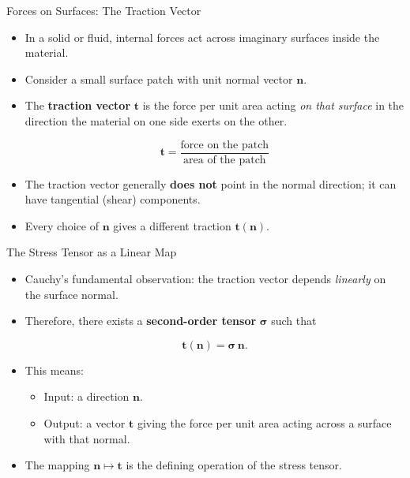 \documentclass{beamer}
\begin{document}
\begin{frame}{Forces on Surfaces: The Traction Vector}

\begin{itemize}

\item In a solid or fluid, internal forces act across imaginary surfaces inside the material.
\item Consider a small surface patch with unit normal vector $\mathbf{n}$.
\item The \textbf{traction vector} $\mathbf{t}$ is the force per unit area acting \emph{on that surface} in the direction the material on one side exerts on the other.

\[
\mathbf{t} = \frac{\text{force on the patch}}{\text{area of the patch}}
\]

\item The traction vector generally \textbf{does not} point in the normal direction; it can have tangential (shear) components.
\item Every choice of $\mathbf{n}$ gives a different traction $\mathbf{t}(\mathbf{n})$.
\end{itemize}

\end{frame}

\begin{frame}{The Stress Tensor as a Linear Map}

\begin{itemize}

\item Cauchy’s fundamental observation: the traction vector depends \emph{linearly} on the surface normal.
\item Therefore, there exists a \textbf{second-order tensor} $\boldsymbol{\sigma}$ such that

\[
\mathbf{t}(\mathbf{n}) = \boldsymbol{\sigma}\,\mathbf{n}.
\]

\item This means:
\begin{itemize}
  \item Input: a direction $\mathbf{n}$.
  \item Output: a vector $\mathbf{t}$ giving the force per unit area acting across a surface with that normal.
\end{itemize}

\item The mapping $\mathbf{n} \mapsto \mathbf{t}$ is the defining operation of the stress tensor.
\end{itemize}

\end{frame}
\end{document}

